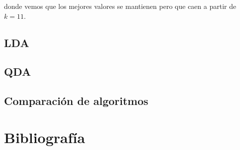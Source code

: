 donde vemos que los mejores valores se mantienen pero que caen a partir de $k=11$.



\subsection{LDA}

\subsection{QDA}

\subsection{Comparación de algoritmos}
\newpage
\section{Bibliografía}




